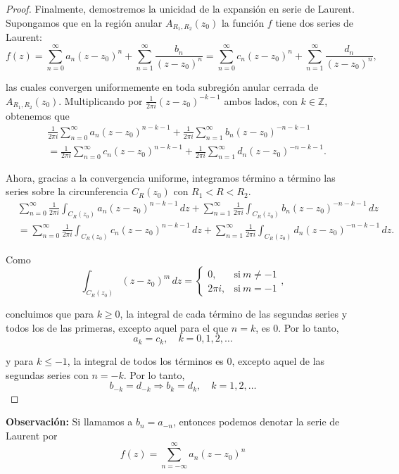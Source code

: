 \begin{proof}
Finalmente, demostremos la unicidad de la expansión en serie de Laurent. Supongamos que en la región anular $A_{R_1,R_2}(z_0)$ la función $f$ tiene dos series de Laurent:
$$ f(z) = \sum_{n=0}^{\infty} a_n (z-z_0)^n + \sum_{n=1}^{\infty} \frac{b_n}{(z-z_0)^n} = \sum_{n=0}^{\infty} c_n (z-z_0)^n + \sum_{n=1}^{\infty} \frac{d_n}{(z-z_0)^n},$$

las cuales convergen uniformemente en toda subregión anular cerrada de $A_{R_1,R_2}(z_0)$. Multiplicando por $\frac{1}{2\pi i}(z-z_0)^{-k-1}$ ambos lados, con $k \in \mathbb{Z}$, obtenemos que 
\begin{align*}
& \frac{1}{2\pi i}\sum_{n=0}^{\infty} a_n (z-z_0)^{n-k-1} + \frac{1}{2\pi i} \sum_{n=1}^{\infty} b_n (z-z_0)^{-n-k-1} \\
&= \frac{1}{2\pi i} \sum_{n=0}^{\infty} c_n (z-z_0)^{n-k-1} + \frac{1}{2\pi i} \sum_{n=1}^{\infty} d_n (z-z_0)^{-n-k-1}.    
\end{align*}

Ahora, gracias a la convergencia uniforme, integramos término a término las series sobre la circunferencia $C_R(z_0)$ con $R_1 < R < R_2$.
\begin{align*}
&\sum_{n=0}^{\infty}  \frac{1}{2\pi i} \int_{C_R(z_0)}a_n (z-z_0)^{n-k-1} \,dz +  \sum_{n=1}^{\infty} \frac{1}{2\pi i}   \int_{C_R(z_0)} b_n (z-z_0)^{-n-k-1} \,dz \\
&=  \sum_{n=0}^{\infty} \frac{1}{2\pi i} \int_{C_R(z_0)}  c_n (z-z_0)^{n-k-1} \,dz  +  \sum_{n=1}^{\infty} \frac{1}{2\pi i} \int_{C_R(z_0)}  d_n (z-z_0)^{-n-k-1} \,dz.    
\end{align*}

Como
$$\int_{C_R(z_0)} (z-z_0)^m \,dz = \left\{ \begin{array}{cl}
    0, &  \mbox{si} ~ m \neq -1\\
     2\pi i ,& \mbox{si} ~ m = -1
\end{array} \right. ,$$

concluimos que para $k \geq 0$, la integral de cada término de las segundas series y todos los de las primeras, excepto aquel para el que $n = k$, es 0. Por lo tanto,
$$a_k = c_k, \quad k = 0,1,2,\dots$$

y para $k \leq -1$, la integral de todos los términos es 0, excepto aquel de las segundas series con $n = -k$. Por lo tanto,
$$b_{-k} = d_{-k} \Rightarrow b_k = d_k, \quad k = 1,2, \dots$$
\end{proof}

\textbf{Observación:} Si llamamos a $b_n = a_{-n}$, entonces podemos denotar la serie de Laurent por
$$f(z) = \sum_{n= - \infty}^{\infty} a_n (z-z_0)^n$$

